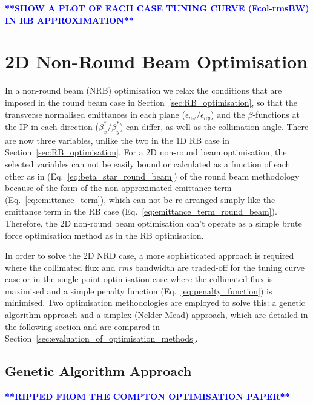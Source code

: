 \documentclass[../main.tex]{subfiles}
\begin{document}
\textcolor{blue}{\textbf{**SHOW A PLOT OF EACH CASE TUNING CURVE (Fcol-rmsBW) IN RB APPROXIMATION**}}

\section{2D Non-Round Beam Optimisation}

In a non-round beam (NRB) optimisation we relax the conditions that are imposed in the round beam case in Section~\ref{sec:RB_optimisation}, so that the transverse normalised emittances in each plane ($\epsilon_{nx}/\epsilon_{ny}$) and the $\beta$-functions at the IP in each direction ($\beta_{x}^{*}/\beta_{y}^{*}$) can differ, as well as the collimation angle. There are now three variables, unlike the two in the 1D RB case in Section~\ref{sec:RB_optimisation}. For a 2D non-round beam optimisation, the selected variables can not be easily bound or calculated as a function of each other as in (Eq.~\ref{eq:beta_star_round_beam}) of the round beam methodology because of the form of the non-approximated emittance term (Eq.~\ref{eq:emittance_term}), which can not be re-arranged simply like the emittance term in the RB case (Eq.~\ref{eq:emittance_term_round_beam}). Therefore, the 2D non-round beam optimisation can't operate as a simple brute force optimisation method as in the RB optimisation.

In order to solve the 2D NRD case, a more sophisticated approach is required where the collimated flux and \textit{rms} bandwidth are traded-off for the tuning curve case or in the single point optimisation case where the collimated flux is maximised and a simple penalty function (Eq.~\ref{eq:penalty_function}) is minimised. Two optimisation methodologies are employed to solve this: a genetic algorithm approach and a simplex (Nelder-Mead) approach, which are detailed in the following section and are compared in Section~\ref{sec:evaluation_of_optimisation_methods}.

\subsection{Genetic Algorithm Approach}

\textcolor{blue}{\textbf{**RIPPED FROM THE COMPTON OPTIMISATION PAPER**}}
\end{document}
